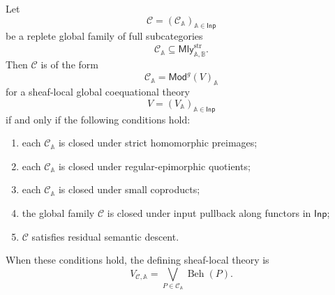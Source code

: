 \begin{theorem}
\label{thm:sheaf-local-global-coequational-birkhoff}
    Let
    \[
        \mathcal C=(\mathcal C_{\mathbb A})_{\mathbb A\in\mathsf{Inp}}
    \]
    be a replete global family of full subcategories
    \[
        \mathcal C_{\mathbb A}
        \subseteq
        \mathsf{Mly}^{\mathrm{str}}_{\mathbb A,\mathbb B}.
    \]
    Then \(\mathcal C\) is of the form
    \[
        \mathcal C_{\mathbb A}
        =
        \mathsf{Mod}^{g}(V)_{\mathbb A}
    \]
    for a sheaf-local global coequational theory
    \[
        V=(V_{\mathbb A})_{\mathbb A\in\mathsf{Inp}}
    \]
    if and only if the following conditions hold:
    \begin{enumerate}
        \item each \(\mathcal C_{\mathbb A}\) is closed under strict
        homomorphic preimages;
        \item each \(\mathcal C_{\mathbb A}\) is closed under
        regular-epimorphic quotients;
        \item each \(\mathcal C_{\mathbb A}\) is closed under small
        coproducts;
        \item the global family \(\mathcal C\) is closed under input pullback
        along functors in \(\mathsf{Inp}\);
        \item \(\mathcal C\) satisfies residual semantic descent.
    \end{enumerate}
    When these conditions hold, the defining sheaf-local theory is
    \[
        V_{\mathcal C,\mathbb A}
        =
        \bigvee_{P\in\mathcal C_{\mathbb A}}
        \operatorname{Beh}(P).
    \]
\end{theorem}

